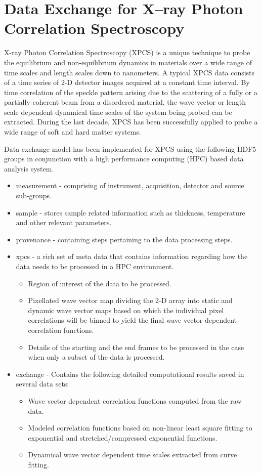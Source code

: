 \documentclass[pdf]{iucr}              %
\begin{document}
\section{Data Exchange for X--ray Photon Correlation Spectroscopy}

X-ray Photon Correlation Spectroscopy (XPCS) is a unique technique to probe the equilibrium and non-equilibrium dynamics in materials over a wide range of time scales and length scales down to nanometers. A typical XPCS data consists of a time series of 2-D detector images acquired at a constant time interval. By time correlation of the speckle pattern arising due to the scattering of a fully or a partially coherent beam from a disordered material, the wave vector or length scale dependent dynamical time scales of the system being probed can be extracted. During the last decade, XPCS has been successfully applied to probe a wide range of soft and hard matter systems.

Data exchange model has been implemented for XPCS using the following HDF5 groups in conjunction with a high performance computing (HPC) based data analysis system.

\begin{itemize}
\item measurement - comprising of instrument, acquisition, detector and source sub-groups.
\item sample - stores sample related information such as thickness, temperature and other relevant parameters.
\item provenance - containing steps pertaining to the data processing steps.
\item xpcs - a rich set of meta data that contains information regarding how the data needs to be processed in a HPC environment.
	\begin{itemize}
	\item Region of interest of the data to be processed.
	\item Pixellated wave vector map dividing the 2-D array into static and dynamic wave vector maps based on which the individual pixel correlations will be binned to yield the final wave vector dependent correlation functions.
	\item Details of the starting and the end frames to be processed in the case when only a subset of the data is processed.
	\end{itemize}

\item exchange - Contains the following detailed computational results saved in several data sets:
	\begin{itemize}
		\item Wave vector dependent correlation functions computed from the raw data.
		\item Modeled correlation functions based on non-linear least square fitting to exponential and stretched/compressed exponential functions.
		\item Dynamical wave vector dependent time scales extracted from curve fitting.
	\end{itemize}
\end{itemize}
\end{document}
